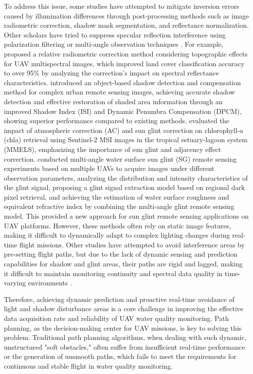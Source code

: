 \documentclass[final,3p,times,numbers]{elsarticle}
\begin{document}
To address this issue, some studies have attempted to mitigate inversion errors caused by illumination differences through post-processing methods such as image radiometric correction, shadow mask segmentation, and reflectance normalization. Other scholars have tried to suppress specular reflection interference using polarization filtering or multi-angle observation techniques \cite{ref:25,ref:28,ref:34,ref:35}. For example, \cite{ref:21} proposed a relative radiometric correction method considering topographic effects for UAV multispectral images, which improved land cover classification accuracy to over 95\% by analyzing the correction's impact on spectral reflectance characteristics. \cite{ref:22} introduced an object-based shadow detection and compensation method for complex urban remote sensing images, achieving accurate shadow detection and effective restoration of shaded area information through an improved Shadow Index (ISI) and Dynamic Penumbra Compensation (DPCM), showing superior performance compared to existing methods. \cite{ref:24} evaluated the impact of atmospheric correction (AC) and sun glint correction on chlorophyll-$a$ (chla) retrieval using Sentinel-2 MSI images in the tropical estuary-lagoon system (MMELS), emphasizing the importance of sun glint and adjacency effect correction. \cite{ref:25} conducted multi-angle water surface sun glint (SG) remote sensing experiments based on multiple UAVs to acquire images under different observation parameters, analyzing the distribution and intensity characteristics of the glint signal, proposing a glint signal extraction model based on regional dark pixel retrieval, and achieving the estimation of water surface roughness and equivalent refractive index by combining the multi-angle glint remote sensing model. This provided a new approach for sun glint remote sensing applications on UAV platforms. However, these methods often rely on static image features, making it difficult to dynamically adapt to complex lighting changes during real-time flight missions. Other studies have attempted to avoid interference areas by pre-setting flight paths, but due to the lack of dynamic sensing and prediction capabilities for shadow and glint areas, their paths are rigid and lagged, making it difficult to maintain monitoring continuity and spectral data quality in time-varying environments \cite{ref:36,ref:37,ref:38}.

Therefore, achieving dynamic prediction and proactive real-time avoidance of light and shadow disturbance areas is a core challenge in improving the effective data acquisition rate and reliability of UAV water quality monitoring. Path planning, as the decision-making center for UAV missions, is key to solving this problem. Traditional path planning algorithms, when dealing with such dynamic, unstructured "soft obstacles," often suffer from insufficient real-time performance or the generation of unsmooth paths, which fails to meet the requirements for continuous and stable flight in water quality monitoring.
\end{document}

